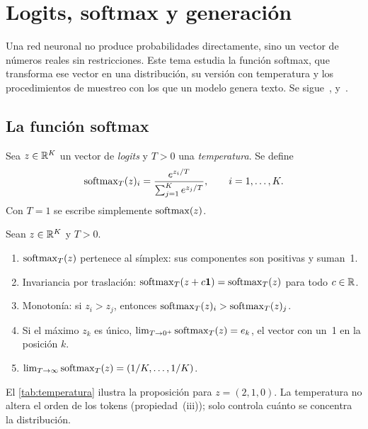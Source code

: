 \chapter{Logits, softmax y generación}
\label{tema:4}

Una red neuronal no produce probabilidades directamente, sino un vector de números reales sin restricciones. Este tema estudia la función softmax, que transforma ese vector en una distribución, su versión con temperatura y los procedimientos de muestreo con los que un modelo genera texto. Se sigue~\cite[§4.1]{d2l}, \cite[§4.1]{gbc} y~\cite[§3.4]{jm3}.

\section{La función softmax}

\begin{definicion}\label{def:softmax}
Sea $z\in\mathbb{R}^{K}$ un vector de \emph{logits} y $T>0$ una \emph{temperatura}. Se define
\[
\operatorname{softmax}_T(z)_i=\frac{e^{z_i/T}}{\sum_{j=1}^{K}e^{z_j/T}},\qquad i=1,\dots,K.
\]
Con $T=1$ se escribe simplemente $\operatorname{softmax}(z)$.
\end{definicion}

\begin{proposicion}[Propiedades]\label{prop:softmax}
Sean $z\in\mathbb{R}^{K}$ y $T>0$.
\begin{enumerate}
  \item $\operatorname{softmax}_T(z)$ pertenece al símplex: sus componentes son positivas y suman~1.
  \item Invariancia por traslación: $\operatorname{softmax}_T(z+c\mathbf{1})=\operatorname{softmax}_T(z)$ para todo $c\in\mathbb{R}$.
  \item Monotonía: si $z_i>z_j$, entonces $\operatorname{softmax}_T(z)_i>\operatorname{softmax}_T(z)_j$.
  \item Si el máximo $z_k$ es único, $\lim_{T\to 0^{+}}\operatorname{softmax}_T(z)=e_k$, el vector con un~1 en la posición $k$.
  \item $\lim_{T\to\infty}\operatorname{softmax}_T(z)=(1/K,\dots,1/K)$.
\end{enumerate}
\end{proposicion}

El \cref{tab:temperatura} ilustra la proposición para $z=(2,1,0)$. La temperatura no altera el orden de los tokens (propiedad~(iii)); solo controla cuánto se concentra la distribución.

